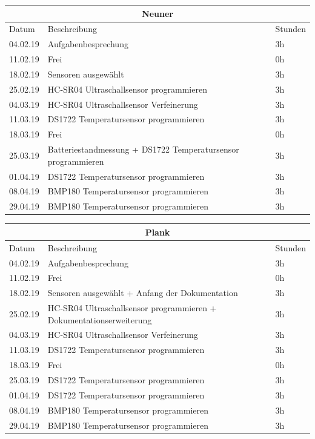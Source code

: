 \documentclass[12pt,a4paper]{article}
\begin{document}
\begin{table}[H]
\centering 
\begin{tabular}{|l|l|l|}
\hline
\multicolumn{3}{|c|}{Neuner}   \\ \hline
Datum & Beschreibung & Stunden \\ \hline
04.02.19 & Aufgabenbesprechung & 3h \\ \hline
11.02.19 & Frei & 0h \\ \hline
18.02.19 & Sensoren ausgewählt & 3h \\ \hline
25.02.19 & HC-SR04 Ultraschallsensor programmieren & 3h \\ \hline
04.03.19 & HC-SR04 Ultraschallsensor Verfeinerung& 3h \\ \hline
11.03.19 & DS1722 Temperatursensor programmieren & 3h \\ \hline
18.03.19 & Frei & 0h\\ \hline
25.03.19 & Batteriestandmessung + DS1722 Temperatursensor programmieren & 3h \\ \hline
01.04.19 & DS1722 Temperatursensor programmieren& 3h \\ \hline
08.04.19 & BMP180 Temperatursensor programmieren & 3h \\ \hline
29.04.19 & BMP180 Temperatursensor programmieren & 3h \\ \hline
\end{tabular}
\end{table}

\begin{table}[H]
\centering 
\begin{tabular}{|l|l|l|}
\hline
\multicolumn{3}{|c|}{Plank}   \\ \hline
Datum & Beschreibung & Stunden \\ \hline
04.02.19 & Aufgabenbesprechung & 3h \\ \hline
11.02.19 & Frei & 0h \\ \hline
18.02.19 & Sensoren ausgewählt + Anfang der Dokumentation & 3h \\ \hline
25.02.19 & HC-SR04 Ultraschallsensor programmieren + Dokumentationserweiterung & 3h \\ \hline
04.03.19 & HC-SR04 Ultraschallsensor Verfeinerung& 3h \\ \hline
11.03.19 & DS1722 Temperatursensor programmieren & 3h \\ \hline
18.03.19 & Frei & 0h\\ \hline
25.03.19 & DS1722 Temperatursensor programmieren & 3h \\ \hline
01.04.19 & DS1722 Temperatursensor programmieren& 3h \\ \hline
08.04.19 & BMP180 Temperatursensor programmieren & 3h \\ \hline
29.04.19 & BMP180 Temperatursensor programmieren & 3h \\ \hline
\end{tabular}
\end{table}
\end{document}
